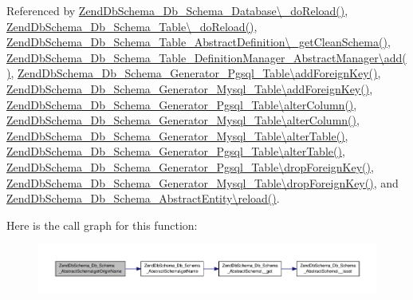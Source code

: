 Referenced by \hyperlink{Database_8php_source_l00109}{Zend\-Db\-Schema\-\_\-\-Db\-\_\-\-Schema\-\_\-\-Database\textbackslash{}\-\_\-do\-Reload()}, \hyperlink{Table_8php_source_l00430}{Zend\-Db\-Schema\-\_\-\-Db\-\_\-\-Schema\-\_\-\-Table\textbackslash{}\-\_\-do\-Reload()}, \hyperlink{AbstractDefinition_8php_source_l00097}{Zend\-Db\-Schema\-\_\-\-Db\-\_\-\-Schema\-\_\-\-Table\-\_\-\-Abstract\-Definition\textbackslash{}\-\_\-get\-Clean\-Schema()}, \hyperlink{AbstractManager_8php_source_l00119}{Zend\-Db\-Schema\-\_\-\-Db\-\_\-\-Schema\-\_\-\-Table\-\_\-\-Definition\-Manager\-\_\-\-Abstract\-Manager\textbackslash{}add()}, \hyperlink{Generator_2Pgsql_2Table_8php_source_l00301}{Zend\-Db\-Schema\-\_\-\-Db\-\_\-\-Schema\-\_\-\-Generator\-\_\-\-Pgsql\-\_\-\-Table\textbackslash{}add\-Foreign\-Key()}, \hyperlink{Generator_2Mysql_2Table_8php_source_l00324}{Zend\-Db\-Schema\-\_\-\-Db\-\_\-\-Schema\-\_\-\-Generator\-\_\-\-Mysql\-\_\-\-Table\textbackslash{}add\-Foreign\-Key()}, \hyperlink{Generator_2Pgsql_2Table_8php_source_l00174}{Zend\-Db\-Schema\-\_\-\-Db\-\_\-\-Schema\-\_\-\-Generator\-\_\-\-Pgsql\-\_\-\-Table\textbackslash{}alter\-Column()}, \hyperlink{Generator_2Mysql_2Table_8php_source_l00182}{Zend\-Db\-Schema\-\_\-\-Db\-\_\-\-Schema\-\_\-\-Generator\-\_\-\-Mysql\-\_\-\-Table\textbackslash{}alter\-Column()}, \hyperlink{Generator_2Mysql_2Table_8php_source_l00074}{Zend\-Db\-Schema\-\_\-\-Db\-\_\-\-Schema\-\_\-\-Generator\-\_\-\-Mysql\-\_\-\-Table\textbackslash{}alter\-Table()}, \hyperlink{Generator_2Pgsql_2Table_8php_source_l00083}{Zend\-Db\-Schema\-\_\-\-Db\-\_\-\-Schema\-\_\-\-Generator\-\_\-\-Pgsql\-\_\-\-Table\textbackslash{}alter\-Table()}, \hyperlink{Generator_2Pgsql_2Table_8php_source_l00351}{Zend\-Db\-Schema\-\_\-\-Db\-\_\-\-Schema\-\_\-\-Generator\-\_\-\-Pgsql\-\_\-\-Table\textbackslash{}drop\-Foreign\-Key()}, \hyperlink{Generator_2Mysql_2Table_8php_source_l00374}{Zend\-Db\-Schema\-\_\-\-Db\-\_\-\-Schema\-\_\-\-Generator\-\_\-\-Mysql\-\_\-\-Table\textbackslash{}drop\-Foreign\-Key()}, and \hyperlink{AbstractEntity_8php_source_l00101}{Zend\-Db\-Schema\-\_\-\-Db\-\_\-\-Schema\-\_\-\-Abstract\-Entity\textbackslash{}reload()}.



Here is the call graph for this function\-:\nopagebreak
\begin{figure}[H]
\begin{center}
\leavevmode
\includegraphics[width=350pt]{classZendDbSchema__Db__Schema__AbstractSchema_adacb1417b461310c5c87f72c459c1985_cgraph}
\end{center}
\end{figure}




